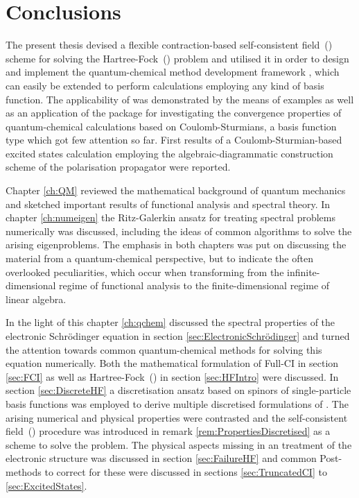 \chapter{Conclusions}
\label{ch:Conclusion}


\noindent
The present thesis devised a flexible contraction-based self-consistent field~(\SCF)
scheme for solving the Hartree-Fock~(\HF) problem
and utilised it in order to design and implement the
quantum-chemical method development framework \molsturm,
which can easily be extended to perform calculations
employing any kind of basis function.
The applicability of \molsturm was demonstrated by the means
of examples as well as an application of the package for
investigating the convergence properties
of quantum-chemical calculations
based on Coulomb-Sturmians,
a basis function type which got few attention so far.
First results of a Coulomb-Sturmian-based excited states
calculation employing the algebraic-diagrammatic construction scheme
of the polarisation propagator were reported.


Chapter \ref{ch:QM} reviewed the mathematical background of quantum mechanics
and sketched important results of functional analysis
and spectral theory.
In chapter \ref{ch:numeigen} the Ritz-Galerkin ansatz
for treating spectral problems numerically
was discussed, including the ideas of common algorithms
to solve the arising eigenproblems.
The emphasis in both chapters
was put on discussing the material from a quantum-chemical perspective,
but to indicate the often overlooked peculiarities,
which occur when transforming from the infinite-dimensional regime
of functional analysis to the finite-dimensional regime of linear algebra.


In the light of this chapter \ref{ch:qchem}
discussed the spectral properties
of the electronic Schrödinger equation in section \ref{sec:ElectronicSchrödinger} and
turned the attention towards common quantum-chemical methods
for solving this equation numerically.
Both the mathematical formulation of Full-CI in section \ref{sec:FCI}
as well as Hartree-Fock~(\HF) in section \ref{sec:HFIntro} were discussed.
In section \ref{sec:DiscreteHF}
a discretisation ansatz based on spinors of
single-particle basis functions was employed
to derive multiple discretised formulations of \HF.
The arising numerical and physical properties were contrasted
and the self-consistent field~(\SCF) procedure
was introduced in remark \ref{rem:PropertiesDiscretised}
as a scheme to solve the \HF problem.
The physical aspects missing in an \HF treatment of the electronic
structure was discussed in section \ref{sec:FailureHF}
and common Post-\HF methods to correct for these were
discussed in sections \ref{sec:TruncatedCI} to \ref{sec:ExcitedStates}.

